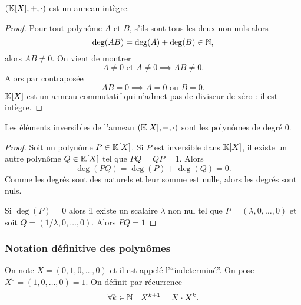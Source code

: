 \begin{cor}
  \((\mathbb{K}[X],+,\cdot)\) est un anneau intègre.
\end{cor}
\begin{proof}
  Pour tout polynôme \(A\) et \(B\), s'ils sont tous les deux non nuls alors
  \begin{equation}
    \deg(AB) = \deg(A)+\deg(B) \in \mathbb{N},
  \end{equation}
  alors \(AB \neq 0\). On vient de montrer
  \begin{equation}
    A\neq 0 \text{~et~} A \neq 0 \implies AB \neq 0.
  \end{equation}
  Alors par contraposée
  \begin{equation}
    AB = 0 \implies A=0 \text{~ou~} B=0.
  \end{equation}
  \(\mathbb{K}[X]\) est un anneau commutatif qui n'admet pas de diviseur de zéro : il est intègre.
\end{proof}

\begin{prop}
  Les éléments inversibles de l'anneau \((\mathbb{K}[X],+,\cdot)\) sont les polynômes de degré \(0\).
\end{prop}
\begin{proof}
  Soit un polynôme \(P \in \mathbb{K}[X]\). Si \(P\) est inversible dans \(\mathbb{K}[X]\), il existe un autre polynôme \(Q \in \mathbb{K}[X]\) tel que \(PQ=QP=1\). Alors
  \begin{equation}
    \deg(PQ)=\deg(P)+\deg(Q)=0.
  \end{equation}
  Comme les degrés sont des naturels et leur somme est nulle, alors les degrés sont nuls.

  Si \(\deg(P)=0\) alors il existe un scalaire \(\lambda\) non nul tel que \(P=(\lambda,0, \ldots, 0)\) et soit \(Q=(1/\lambda, 0, \ldots, 0)\). Alors \(PQ=1\)
\end{proof}

\subsubsection{Notation définitive des polynômes}

On note \(X = (0,1,0, \ldots, 0)\) et il est appelé l'``indeterminé''. On pose \(X^0=(1,0, \ldots,0)=1\). On définit par récurrence
\begin{equation}
  \forall k \in \mathbb{N} \quad X^{k+1}=X \cdot X^k.
\end{equation}

